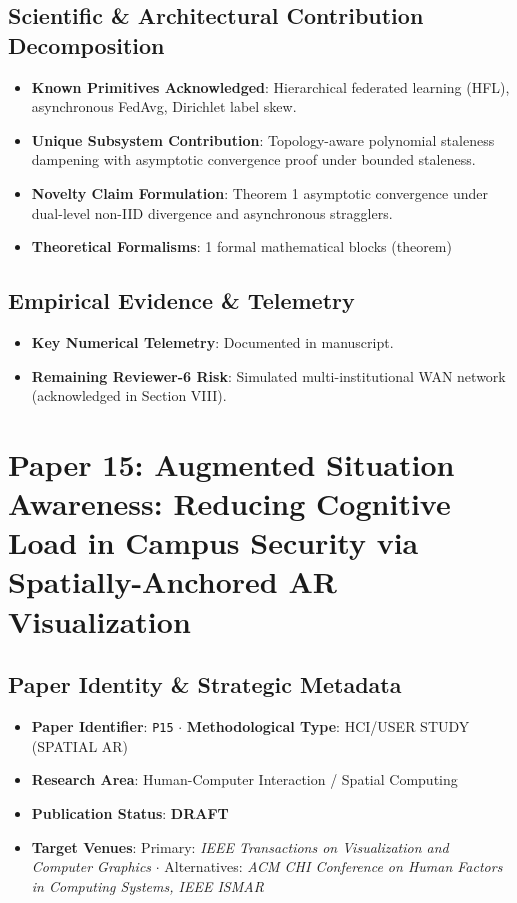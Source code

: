 \documentclass[11pt,a4paper]{article}
\begin{document}
\subsection*{Scientific & Architectural Contribution Decomposition}
\begin{itemize}[leftmargin=1.5em, itemsep=0.2em]
    \item \textbf{Known Primitives Acknowledged}: Hierarchical federated learning (HFL), asynchronous FedAvg, Dirichlet label skew.
    \item \textbf{Unique Subsystem Contribution}: Topology-aware polynomial staleness dampening with asymptotic convergence proof under bounded staleness.
    \item \textbf{Novelty Claim Formulation}: Theorem 1 asymptotic convergence under dual-level non-IID divergence and asynchronous stragglers.
    \item \textbf{Theoretical Formalisms}: 1 formal mathematical blocks (theorem)
\end{itemize}

\subsection*{Empirical Evidence & Telemetry}
\begin{itemize}[leftmargin=1.5em, itemsep=0.2em]
    \item \textbf{Key Numerical Telemetry}: Documented in manuscript.
    \item \textbf{Remaining Reviewer-6 Risk}: Simulated multi-institutional WAN network (acknowledged in Section VIII).
\end{itemize}

\section{Paper 15: Augmented Situation Awareness: Reducing Cognitive Load in Campus Security via Spatially-Anchored AR Visualization}

\subsection*{Paper Identity \& Strategic Metadata}
\begin{itemize}[leftmargin=1.5em, itemsep=0.2em]
    \item \textbf{Paper Identifier}: \texttt{P15} $\cdot$ \textbf{Methodological Type}: HCI/USER STUDY (SPATIAL AR)
    \item \textbf{Research Area}: Human-Computer Interaction / Spatial Computing
    \item \textbf{Publication Status}: \textbf{DRAFT}
    \item \textbf{Target Venues}: Primary: \textit{IEEE Transactions on Visualization and Computer Graphics} $\cdot$ Alternatives: \textit{ACM CHI Conference on Human Factors in Computing Systems, IEEE ISMAR}
\end{itemize}
\end{document}
